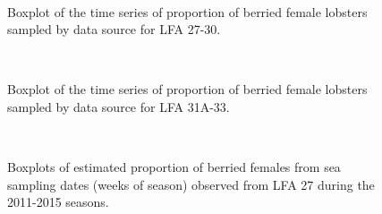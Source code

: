\documentclass[11pt]{article}
\newcommand{\e}{/backup/bio_data/bio.lobster/figures/} %
\begin{document}
\begin{figure}
        \centering
         \\
                     \caption{Boxplot of the time series of proportion of berried female lobsters sampled by data source for LFA 27-30.}
        \end{figure}

\begin{figure}
        \centering
         \\
                    \caption{Boxplot of the time series of proportion of berried female lobsters sampled by data source for LFA 31A-33. }
        \end{figure}

\begin{figure}
        \centering
         \\
                     \caption{Boxplots of estimated proportion of berried females from sea sampling dates (weeks of season) observed from LFA 27 during the 2011-2015 seasons. }
        \end{figure}
\end{document}
